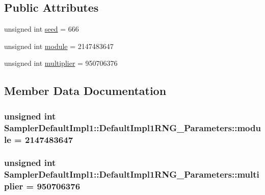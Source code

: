 \subsection*{Public Attributes}
\begin{DoxyCompactItemize}
\item 
unsigned int \hyperlink{class_sampler_default_impl1_1_1_default_impl1_r_n_g___parameters_a32cf0e83a0b27a5f2cef15e8fdfe003e}{seed} = 666
\item 
unsigned int \hyperlink{class_sampler_default_impl1_1_1_default_impl1_r_n_g___parameters_ad6e4e6ffc3f62a1f837245edeee5e06d}{module} = 2147483647
\item 
unsigned int \hyperlink{class_sampler_default_impl1_1_1_default_impl1_r_n_g___parameters_a53063960d9de7d773e7e05af20ecd735}{multiplier} = 950706376
\end{DoxyCompactItemize}


\subsection{Member Data Documentation}
\subsubsection[{\texorpdfstring{module}{module}}]{\setlength{\rightskip}{0pt plus 5cm}unsigned int Sampler\+Default\+Impl1\+::\+Default\+Impl1\+R\+N\+G\+\_\+\+Parameters\+::module = 2147483647}\hypertarget{class_sampler_default_impl1_1_1_default_impl1_r_n_g___parameters_ad6e4e6ffc3f62a1f837245edeee5e06d}{}\label{class_sampler_default_impl1_1_1_default_impl1_r_n_g___parameters_ad6e4e6ffc3f62a1f837245edeee5e06d}
\subsubsection[{\texorpdfstring{multiplier}{multiplier}}]{\setlength{\rightskip}{0pt plus 5cm}unsigned int Sampler\+Default\+Impl1\+::\+Default\+Impl1\+R\+N\+G\+\_\+\+Parameters\+::multiplier = 950706376}\hypertarget{class_sampler_default_impl1_1_1_default_impl1_r_n_g___parameters_a53063960d9de7d773e7e05af20ecd735}{}\label{class_sampler_default_impl1_1_1_default_impl1_r_n_g___parameters_a53063960d9de7d773e7e05af20ecd735}

